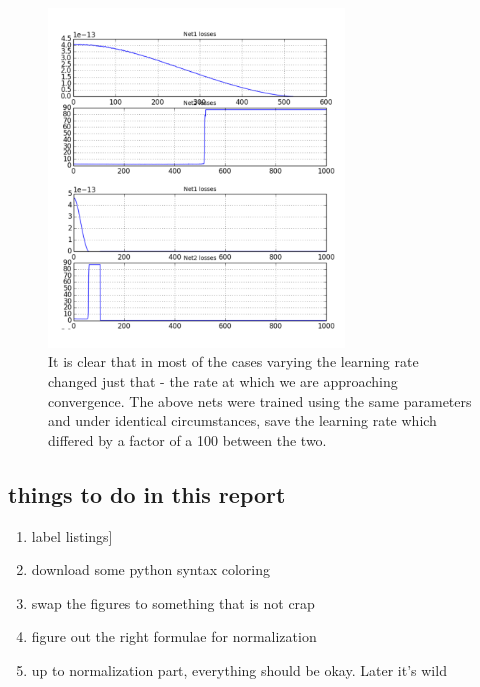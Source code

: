 \documentclass[a4paper, 11pt]{article}
\numberwithin{equation}{section}
\begin{document}
	\begin{figure}[!h]
		\centering
		\includegraphics[page=1,width=0.7\textwidth]{learning_rate_variation.pdf}
		\caption{\label{fig:learning_rate_variation}{It is clear that in most of the cases varying the learning rate changed just that - the rate at which we are approaching convergence. The above nets were trained using the same parameters and under identical circumstances, save the learning rate which differed by a factor of a 100 between the two.}}
	\end{figure}
	
	
	
	
	
	\newpage
	\clearpage
	\subsection{things to do in this report}
	\begin{enumerate}
		\item label listings]
		\item download some python syntax coloring
		\item swap the figures to something that is not crap
		\item figure out the right formulae for normalization
		\item up to normalization part, everything should be okay. Later it's wild
	\end{enumerate}
	
	
	\newpage
	
	\clearpage
	
	\newpage
	\pagestyle{plain}
	
	
	
	
\end{document}
